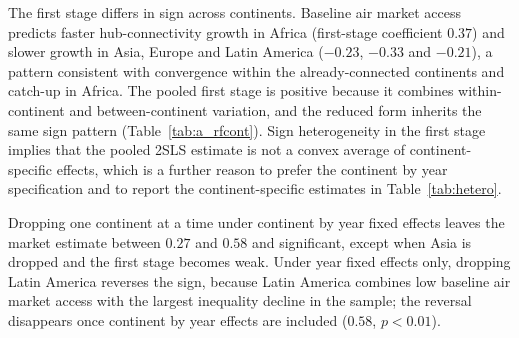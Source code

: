 The first stage differs in sign across continents. Baseline air market access predicts faster hub-connectivity growth in Africa (first-stage coefficient $0.37$) and slower growth in Asia, Europe and Latin America ($-0.23$, $-0.33$ and $-0.21$), a pattern consistent with convergence within the already-connected continents and catch-up in Africa. The pooled first stage is positive because it combines within-continent and between-continent variation, and the reduced form inherits the same sign pattern (Table~\ref{tab:a_rfcont}). Sign heterogeneity in the first stage implies that the pooled 2SLS estimate is not a convex average of continent-specific effects, which is a further reason to prefer the continent by year specification and to report the continent-specific estimates in Table~\ref{tab:hetero}.

Dropping one continent at a time under continent by year fixed effects leaves the market estimate between $0.27$ and $0.58$ and significant, except when Asia is dropped and the first stage becomes weak. Under year fixed effects only, dropping Latin America reverses the sign, because Latin America combines low baseline air market access with the largest inequality decline in the sample; the reversal disappears once continent by year effects are included ($0.58$, $p<0.01$).

